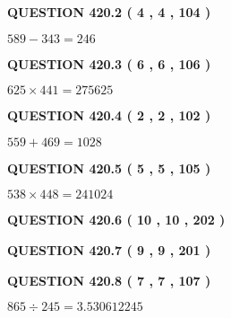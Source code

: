 \documentclass{ctexart}
\begin{document}
\vspace{0.2in}
  
{\textbf{\Large{QUESTION
420.2 
 ( 4 , 4 , 104 )
}}}
  
  
 
 

$ %
589 -  %
343=   %
246$
 
 
  
\vspace{0.2in}
  
{\textbf{\Large{QUESTION
420.3 
 ( 6 , 6 , 106 )
}}}
  
  
 
 

$ %
625 \times  %
441=   %
275625$
 
 
  
\vspace{0.2in}
  
{\textbf{\Large{QUESTION
420.4 
 ( 2 , 2 , 102 )
}}}
  
  
 
 

$ %
559 +  %
469=   %
1028$
 
 
  
\vspace{0.2in}
  
{\textbf{\Large{QUESTION
420.5 
 ( 5 , 5 , 105 )
}}}
  
  
 
 

$ %
538 \times  %
448=   %
241024$
 
 
  
\vspace{0.2in}
  
{\textbf{\Large{QUESTION
420.6 
 ( 10 , 10 , 202 )
}}}
  
  
  
\vspace{0.2in}
  
{\textbf{\Large{QUESTION
420.7 
 ( 9 , 9 , 201 )
}}}
  
  
  
\vspace{0.2in}
  
{\textbf{\Large{QUESTION
420.8 
 ( 7 , 7 , 107 )
}}}
  
  
 
 

$ %
865 \div  %
245=   %
3.530612245$
 
 
  
\vspace{0.2in}
  
\end{document}
